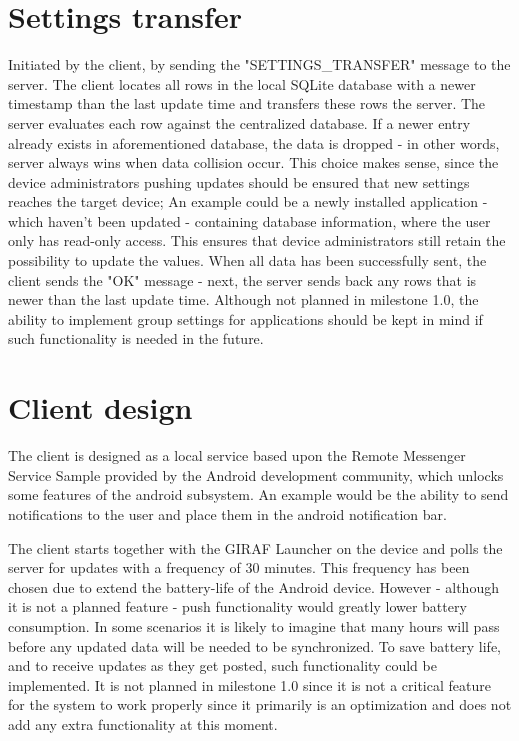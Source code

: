 \section{Settings transfer}
Initiated by the client, by sending the "SETTINGS\_TRANSFER" message to the server. The client locates all rows in the local SQLite database with a newer timestamp than the last update time and transfers these rows the server. The server evaluates each row against the centralized database. If a newer entry already exists in aforementioned database, the data is dropped - in other words, server always wins when data collision occur. This choice makes sense, since the device administrators pushing updates should be ensured that new settings reaches the target device; An example could be a newly installed application - which haven't been updated - containing database information, where the user only has read-only access. This ensures that device administrators still retain the possibility to update the values.
When all data has been successfully sent, the client sends the "OK" message - next, the server sends back any rows that is newer than the last update time. Although not planned in milestone 1.0, the ability to implement group settings for applications should be kept in mind if such functionality is needed in the future. 


\section{Client design}
The client is designed as a local service based upon the Remote Messenger Service Sample provided by the Android development community\cite{AndDevel3}, which unlocks some features of the android subsystem. An example would be the ability to send notifications to the user and place them in the android notification bar.

The client starts together with the GIRAF Launcher on the device and polls the server for updates with a frequency of 30 minutes. This frequency has been chosen due to extend the battery-life of the Android device. However - although it is not a planned feature - push functionality would greatly lower battery consumption. In some scenarios it is likely to imagine that many hours will pass before any updated data will be needed to be synchronized. To save battery life, and to receive updates as they get posted, such functionality could be implemented. It is not planned in milestone 1.0 since it is not a critical feature for the system to work properly since it primarily is an optimization and does not add any extra functionality at this moment. 

